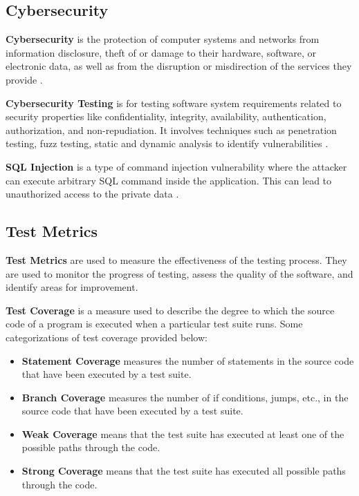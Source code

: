 \subsection{Cybersecurity}\label{subsec:cybersecurity}

\textbf{Cybersecurity} is the protection of computer systems and networks from information disclosure, theft of or damage to their hardware, software, or electronic data, as well as from the disruption or misdirection of the services they provide \cite{FELDERER20161}.

\textbf{Cybersecurity Testing} is for testing software system requirements related to security properties like confidentiality, integrity, availability, authentication, authorization, and non-repudiation.
It involves techniques such as penetration testing, fuzz testing, static and dynamic analysis to identify vulnerabilities \cite{FELDERER20161}.

\textbf{SQL Injection} is a type of command injection vulnerability where the attacker can execute arbitrary SQL command inside the application.
This can lead to unauthorized access to the private data \cite{SQLInjection}.

\subsection{Test Metrics}\label{subsec:test-metrics}

\textbf{Test Metrics} are used to measure the effectiveness of the testing process.
They are used to monitor the progress of testing, assess the quality of the software, and identify areas for improvement.

\textbf{Test Coverage} is a measure used to describe the degree to which the source code of a program is executed when a particular test suite runs.
Some categorizations of test coverage provided below:

\begin{itemize}
    \item \textbf{Statement Coverage} measures the number of statements in the source code that have been executed by a test suite.
    \item \textbf{Branch Coverage} measures the number of if conditions, jumps, etc., in the source code that have been executed by a test suite.
    \item \textbf{Weak Coverage} means that the test suite has executed at least one of the possible paths through the code.
    \item \textbf{Strong Coverage} means that the test suite has executed all possible paths through the code.
\end{itemize}


